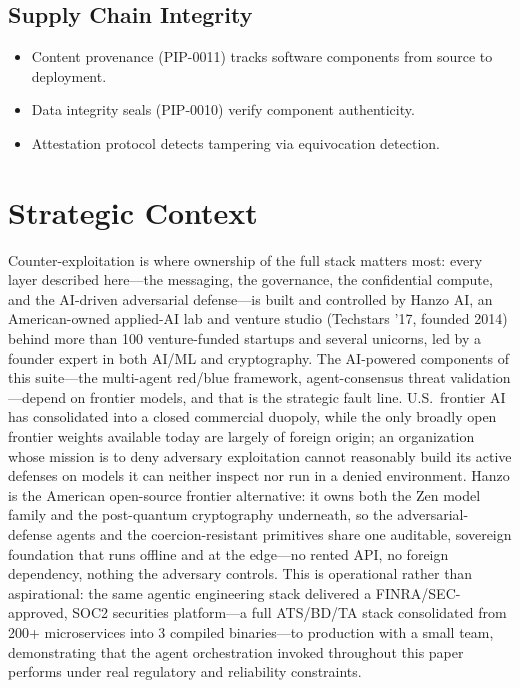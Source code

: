 \documentclass[11pt,letterpaper]{article}
\begin{document}
\subsection{Supply Chain Integrity}

\begin{itemize}
\item Content provenance (PIP-0011) tracks software components from source to deployment.
\item Data integrity seals (PIP-0010) verify component authenticity.
\item Attestation protocol detects tampering via equivocation detection.
\end{itemize}

\section{Strategic Context}

Counter-exploitation is where ownership of the full stack matters most: every layer described here---the messaging, the governance, the confidential compute, and the AI-driven adversarial defense---is built and controlled by Hanzo AI, an American-owned applied-AI lab and venture studio (Techstars '17, founded 2014) behind more than 100 venture-funded startups and several unicorns, led by a founder expert in both AI/ML and cryptography. The AI-powered components of this suite---the multi-agent red/blue framework, agent-consensus threat validation---depend on frontier models, and that is the strategic fault line. U.S.\ frontier AI has consolidated into a closed commercial duopoly, while the only broadly open frontier weights available today are largely of foreign origin; an organization whose mission is to deny adversary exploitation cannot reasonably build its active defenses on models it can neither inspect nor run in a denied environment. Hanzo is the American open-source frontier alternative: it owns both the Zen model family and the post-quantum cryptography underneath, so the adversarial-defense agents and the coercion-resistant primitives share one auditable, sovereign foundation that runs offline and at the edge---no rented API, no foreign dependency, nothing the adversary controls. This is operational rather than aspirational: the same agentic engineering stack delivered a FINRA/SEC-approved, SOC2 securities platform---a full ATS/BD/TA stack consolidated from 200+ microservices into 3 compiled binaries---to production with a small team, demonstrating that the agent orchestration invoked throughout this paper performs under real regulatory and reliability constraints.
\end{document}
